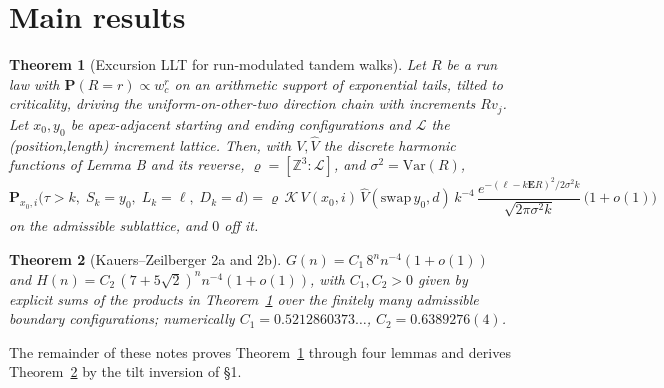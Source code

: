 \documentclass[11pt]{article}
\newtheorem{theorem}{Theorem}\newtheorem{lemma}{Lemma}\newtheorem{proposition}{Proposition}
\newcommand{\E}{\mathbf{E}}\newcommand{\Lat}{\mathcal{L}}\renewcommand{\Pr}{\mathbf{P}}
\begin{document}
\section{Main results}
\begin{theorem}[Excursion LLT for run-modulated tandem walks]\label{thm:main}
Let $R$ be a run law with $\Pr(R=r)\propto w_c^r$ on an arithmetic support of exponential
tails, tilted to criticality, driving the uniform-on-other-two direction chain with
increments $Rv_j$. Let $x_0,y_0$ be apex-adjacent starting and ending configurations and
$\Lat$ the (position,length) increment lattice. Then, with $V,\widehat V$ the discrete
harmonic functions of Lemma B and its reverse, $\varrho=[\mathbb{Z}^3:\Lat]$, and
$\sigma^2=\mathrm{Var}(R)$,
$$\Pr_{x_0,i}\big(\tau>k,\;S_k=y_0,\;L_k=\ell,\;D_k=d\big)
=\varrho\,\mathcal K\,V(x_0,i)\,\widehat V(\mathrm{swap}\,y_0,d)\,
k^{-4}\,\frac{e^{-(\ell-k\E R)^2/2\sigma^2k}}{\sqrt{2\pi\sigma^2k}}\,\big(1+o(1)\big)$$
on the admissible sublattice, and $0$ off it.
\end{theorem}
\begin{theorem}[Kauers--Zeilberger 2a and 2b]\label{thm:kz}
$G(n)=C_1\,8^n n^{-4}(1+o(1))$ and $H(n)=C_2\,(7+5\sqrt2)^n n^{-4}(1+o(1))$, with
$C_1,C_2>0$ given by explicit sums of the products in Theorem~\ref{thm:main} over the
finitely many admissible boundary configurations; numerically $C_1=0.5212860373\ldots$,
$C_2=0.6389276(4)$.
\end{theorem}
The remainder of these notes proves Theorem~\ref{thm:main} through four lemmas and derives
Theorem~\ref{thm:kz} by the tilt inversion of \S1.
\end{document}
